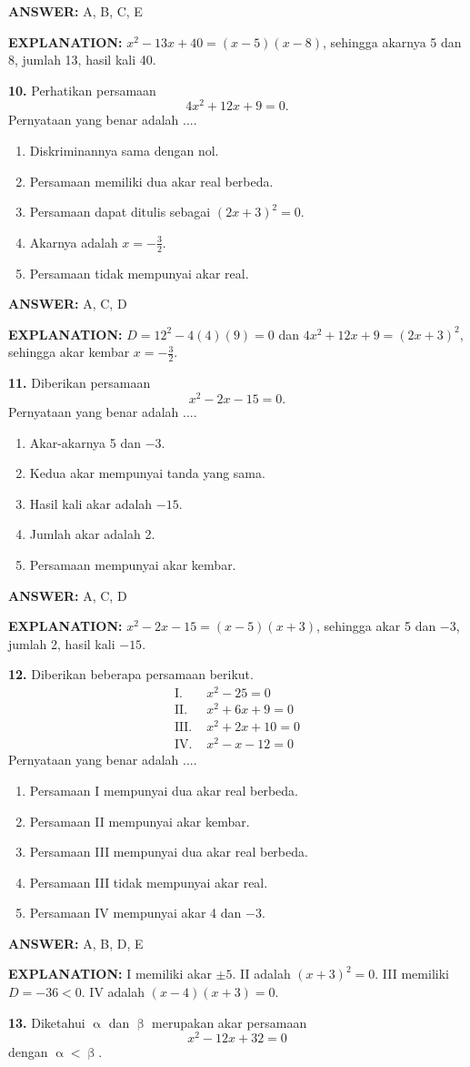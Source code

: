 \documentclass[11pt,a4paper]{article}
\newcommand{\answer}[1]{\par\medskip\textbf{\color{jawab}ANSWER:} #1\par}
\newcommand{\explanation}[1]{\textbf{\color{jelas}EXPLANATION:} #1\par\medskip}
\newcommand{\question}[1]{\Needspace{7\baselineskip}\par\medskip\textbf{#1}\quad}
\newenvironment{choices}{\begin{enumerate}[label=\Alph*.,leftmargin=1.8em]}{\end{enumerate}}
\begin{document}
\answer{A, B, C, E}\explanation{$x^2-13x+40=(x-5)(x-8)$, sehingga akarnya 5 dan 8, jumlah 13, hasil kali 40.}
\question{10.} Perhatikan persamaan \[4x^2+12x+9=0.\] Pernyataan yang benar adalah ....
\begin{choices}\item Diskriminannya sama dengan nol.\item Persamaan memiliki dua akar real berbeda.\item Persamaan dapat ditulis sebagai $(2x+3)^2=0$.\item Akarnya adalah $x=-\frac32$.\item Persamaan tidak mempunyai akar real.\end{choices}
\answer{A, C, D}\explanation{$D=12^2-4(4)(9)=0$ dan $4x^2+12x+9=(2x+3)^2$, sehingga akar kembar $x=-\frac32$.}
\question{11.} Diberikan persamaan \[x^2-2x-15=0.\] Pernyataan yang benar adalah ....
\begin{choices}\item Akar-akarnya 5 dan $-3$.\item Kedua akar mempunyai tanda yang sama.\item Hasil kali akar adalah $-15$.\item Jumlah akar adalah 2.\item Persamaan mempunyai akar kembar.\end{choices}
\answer{A, C, D}\explanation{$x^2-2x-15=(x-5)(x+3)$, sehingga akar 5 dan $-3$, jumlah 2, hasil kali $-15$.}
\question{12.} Diberikan beberapa persamaan berikut.
\begin{align*}\text{I. }&x^2-25=0\\\text{II. }&x^2+6x+9=0\\\text{III. }&x^2+2x+10=0\\\text{IV. }&x^2-x-12=0\end{align*}
Pernyataan yang benar adalah ....
\begin{choices}\item Persamaan I mempunyai dua akar real berbeda.\item Persamaan II mempunyai akar kembar.\item Persamaan III mempunyai dua akar real berbeda.\item Persamaan III tidak mempunyai akar real.\item Persamaan IV mempunyai akar 4 dan $-3$.\end{choices}
\answer{A, B, D, E}\explanation{I memiliki akar $\pm5$. II adalah $(x+3)^2=0$. III memiliki $D=-36<0$. IV adalah $(x-4)(x+3)=0$.}
\question{13.} Diketahui $\upalpha$ dan $\upbeta$ merupakan akar persamaan \[x^2-12x+32=0\] dengan $\upalpha<\upbeta$.
\end{document}
